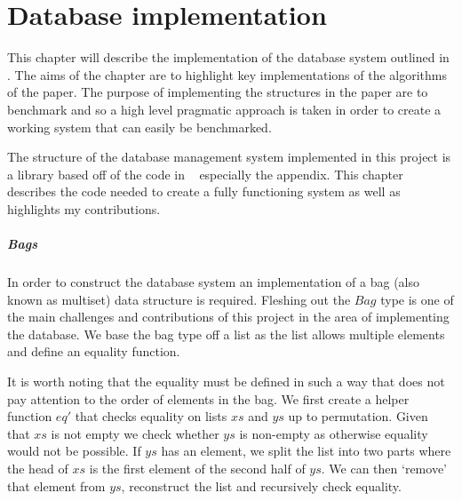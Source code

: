 \chapter{Database implementation}\label{chap:database}
This chapter will describe the implementation of the database system outlined in
\relalg{}. The aims of the chapter are to highlight key implementations of the
algorithms of the paper. The purpose of implementing the structures in the paper
are to benchmark and so a high level pragmatic approach is taken in order to
create a working system that can easily be benchmarked.

The structure of the database management system implemented in this
project is a library based off of the code in
\relalg{}~\cite{RelationalAlgebraByWayOfAdjunctions} especially the appendix.
This chapter describes the code needed to create a fully functioning
system as well as highlights my contributions.

\paragraph{Bags} In order to construct the database system an
implementation of a bag (also known as multiset) data structure is
required. Fleshing out the $Bag$ type is one of the main challenges and
contributions of this project in the area of implementing the database. We
base the bag type off a list as the list allows multiple elements and
define an equality function.



\noindent
It is worth noting that the equality must be defined in such a way that does not
pay attention to the order of elements in the bag. We first create a helper
function $eq'$ that checks equality on lists $xs$ and $ys$ up to permutation.
Given that $xs$ is not empty we check whether $ys$ is non-empty as otherwise
equality would not be possible. If $ys$ has an element, we split the list into
two parts where the head of $xs$ is the first element of the second half of
$ys$. We can then `remove' that element from $ys$, reconstruct the list and
recursively check equality.

